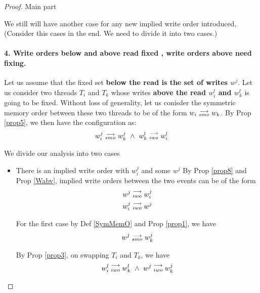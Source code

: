 \begin{proof}{Main part}
\begin{itemize}
\begin{itemize}
                        \end{itemize}

                \end{itemize}
            
            We still will have another case for any new implied write order introduced, (Consider this cases in the end. We need to divide it into two cases.)
            \paragraph{4. Write orders below and above read fixed , write orders above need fixing.} 
                
                Let us assume that the fixed set \textbf{below the read is the set of writes $w^j$}. Let us consider two threads $T_i$ and $T_k$ whose writes \textbf{above the read $w_i^l$ and $w_k^l$} is going to be fixed. Without loss of generality, let us conisder the symmetric memory order between these two threads to be of the form $w_i\stackrel{\longrightarrow}{_{smo}}w_k$.  By Prop \ref{prop5}, we then have the configuration as:
                \begin{align*}
                    \reln{w_i^j}{smo}{w_k^j} \ \wedge \ \reln{w_k^l}{iwo}{w_i^l}
                \end{align*}

                We divide our analysis into two cases 
                \begin{itemize}
                    \item There is an implied write order with $w_i^j$ and some $w^j$
                        By Prop \ref{prop8} and Prop \ref{Wabv}, implied write orders between the two events can be of the form 
                        \begin{align*}
                            w^j\stackrel{\longrightarrow}{_{iwo}}w_i^j \\
                            w_i^j\stackrel{\longrightarrow}{_{iwo}}w^j 
                        \end{align*}

                        For the first case by Def \ref{SymMemO} and Prop \ref{prop1}, we have
                        \begin{align*}
                            w^j\stackrel{\longrightarrow}{_{smo}}w_k^j
                        \end{align*}

                        By Prop \ref{prop3}, on swapping $T_i$ and $T_k$, we have 
                        \begin{align*}
                            \reln{w_i^l}{iwo}{w_k^l} \ \wedge \ \reln{w^j}{iwo}{w_k^j}
                        \end{align*}


\end{itemize}
\end{proof}
